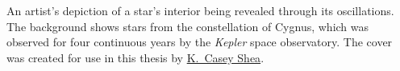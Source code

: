 \vspace*{0.5cm}
 An artist's depiction of a star's interior being revealed through its oscillations. 
The background shows stars from the constellation of Cygnus, which was observed for four continuous years by the \emph{Kepler} space observatory. 
The cover was created for use in this thesis by \href{https://kcaseyshea.com/}{K.\ Casey Shea}.
\clearpage